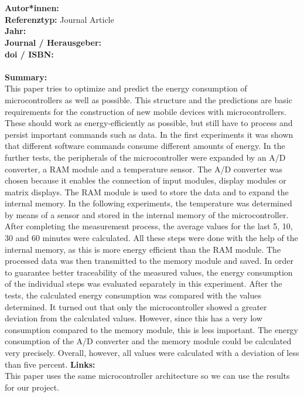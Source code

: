 \documentclass{report}
\newcommand{\createJournalArticleHeader}[1]{
    {\let\clearpage\relax \chapter{\citetitle{#1}}}
    \noindent
    \textbf{Autor*innen:} \citeauthor{#1} \\
    \textbf{Referenztyp:} Journal Article\\
    \textbf{Jahr:} \citeyear{#1} \\
    \textbf{Journal / Herausgeber:} \citefield{#1}{journaltitle}\\
    \textbf{doi / ISBN:} \citefield{#1}{doi} \\\\
    \textbf{Summary:}\\
}
\begin{document}

\createJournalArticleHeader{konstantakos_energy_2008}
This paper tries to optimize and predict the energy consumption of microcontrollers as well as possible. This structure and the predictions are basic requirements for the construction of new mobile devices with microcontrollers. These should work as energy-efficiently as possible, but still have to process and persist important commands such as data. In the first experiments it was shown that different software commands consume different amounts of energy. In the further tests, the peripherals of the microcontroller were expanded by an A/D converter, a RAM module and a temperature sensor. The A/D converter was chosen because it enables the connection of input modules, display modules or matrix displays. The RAM module is used to store the data and to expand the internal memory. In the following experiments, the temperature was determined by means of a sensor and stored in the internal memory of the microcontroller. After completing the measurement process, the average values for the last 5, 10, 30 and 60 minutes were calculated. All these steps were done with the help of the internal memory, as this is more energy efficient than the RAM module. The processed data was then transmitted to the memory module and saved. In order to guarantee better traceability of the measured values, the energy consumption of the individual steps was evaluated separately in this experiment.\linebreak
After the tests, the calculated energy consumption was compared with the values determined. It turned out that only the microcontroller showed a greater deviation from the calculated values. However, since this has a very low consumption compared to the memory module, this is less important. The energy consumption of the A/D converter and the memory module could be calculated very precisely. Overall, however, all values were calculated with a deviation of less than five percent.\linebreak\linebreak
\textbf{Links:}\\
This paper uses the same microcontroller architecture so we can use the results for our project.
\pagebreak
	
	
\end{document}
